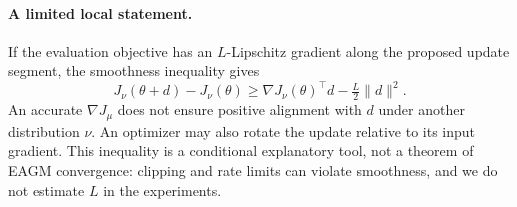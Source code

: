 \paragraph{A limited local statement.}
If the evaluation objective has an $L$-Lipschitz gradient along the proposed update segment, the smoothness inequality gives
\begin{equation}
 J_\nu(\theta+d)-J_\nu(\theta)
 \geq \nabla J_\nu(\theta)^\top d-\tfrac L2\|d\|^2.
\end{equation}
An accurate $\nabla J_\mu$ does not ensure positive alignment with $d$ under another distribution $\nu$. An optimizer may also rotate the update relative to its input gradient. This inequality is a conditional explanatory tool, not a theorem of EAGM convergence: clipping and rate limits can violate smoothness, and we do not estimate $L$ in the experiments.
